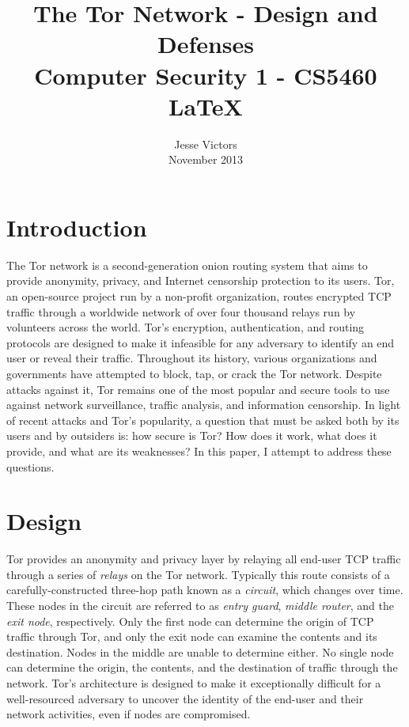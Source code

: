 \documentclass[journal]{IEEEtran}
\begin{document}
\title{The Tor Network - Design and Defenses \\ \Large Computer Security 1 - CS5460 \\ \LaTeX{}}
\author{Jesse Victors \\ November 2013}

\maketitle

\section{Introduction}

The Tor network is a second-generation onion routing system that aims to provide anonymity, privacy, and Internet censorship protection to its users. Tor, an open-source project run by a non-profit organization, routes encrypted TCP traffic through a worldwide network of over four thousand relays run by volunteers across the world. Tor's encryption, authentication, and routing protocols are designed to make it infeasible for any adversary to identify an end user or reveal their traffic. Throughout its history, various organizations and governments have attempted to block, tap, or crack the Tor network. Despite attacks against it, Tor remains one of the most popular and secure tools to use against network surveillance, traffic analysis, and information censorship. In light of recent attacks and Tor's popularity, a question that must be asked both by its users and by outsiders is: how secure is Tor? How does it work, what does it provide, and what are its weaknesses? In this paper, I attempt to address these questions.

\section{Design}

Tor provides an anonymity and privacy layer by relaying all end-user TCP traffic through a series of \textit{relays} on the Tor network. Typically this route consists of a carefully-constructed three-hop path known as a \textit{circuit}, which changes over time. These nodes in the circuit are referred to as \textit{entry guard}, \textit{middle router}, and the \textit{exit node}, respectively. Only the first node can determine the origin of TCP traffic through Tor, and only the exit node can examine the contents and its destination. Nodes in the middle are unable to determine either. No single node can determine the origin, the contents, and the destination of traffic through the network. Tor's architecture is designed to make it exceptionally difficult for a well-resourced adversary to uncover the identity of the end-user and their network activities, even if nodes are compromised.\cite{McCoy2008}
\end{document}
